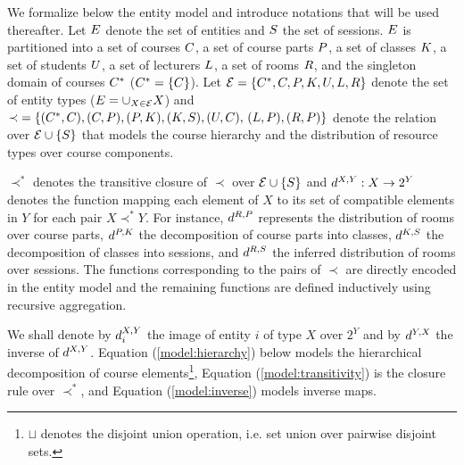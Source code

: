 We formalize below the entity model and introduce notations that will be used thereafter.
Let ${E}$ denote the set of entities
and ${S}$ the set of sessions.
${E}$ is partitioned into   
a set of courses ${C}$, 
a set of course parts ${P}$, 
a set of classes ${K}$, 
a set of students ${U}$, 
a set of lecturers ${L}$,
a set of rooms ${R}$,
and the singleton domain of courses ${C^{*}}$ 
(${C^{*}}=\{C\}$). 
Let 
$
{\mathcal{E}}
=
\{
{C^{*}}, 
{C},
{P},
{K},
{U},
{L},
{R}
\}
$
denote the set of entity types
(${E}=\cup_{X \in \mathcal{E}}X$)
and 
$
{\prec}
=
\myset{
({\COURSES},{\COURSE}),
({\COURSE},{\PART}),
({\PART},{\CLASS}),
({\CLASS},{\SESSION}),
({\STUDENT},{\COURSE}),
$
$
({\TEACHER},{\PART}),
({\ROOM},{\PART})
}
$
denote the relation over 
${\mathcal{E}}\cup\{S\}$ 
that models the course hierarchy
and the distribution of resource types over course components.

${\prec^{*}}$
denotes the transitive %
closure of
${\prec}$ 
over
${\mathcal{E}}\cup\{S\}$
and
${d^{X,Y}}:X\rightarrow2^{Y}$
denotes the function mapping each element of $X$ to its set of compatible elements in $Y$
for each pair %
$X{\prec^{*}}Y$.
For instance, 
${d^{R,P}}$ 
represents the distribution of rooms over course parts, 
${d^{P,K}}$ 
the decomposition of course parts into classes,
${d^{K,S}}$ 
the decomposition of classes into sessions,
and ${d^{R,S}}$ 
the inferred distribution of rooms over sessions.
The functions corresponding to the pairs of $\prec$
are directly encoded in the entity model
and the remaining functions are defined inductively using recursive aggregation. 

We shall denote by ${d^{X,Y}_{i}}$ the image of entity $i$ of type $X$ over $2^Y$ %
and by ${d^{Y,X}}$ the inverse of ${d^{X,Y}}$.
Equation (\ref{model:hierarchy}) below models the hierarchical decomposition of course elements\footnote{$\sqcup$ denotes the disjoint union operation, i.e. set union over pairwise disjoint sets.},
Equation (\ref{model:transitivity}) is the closure rule over 
$\prec^{*}$,
and Equation (\ref{model:inverse}) models inverse maps.

